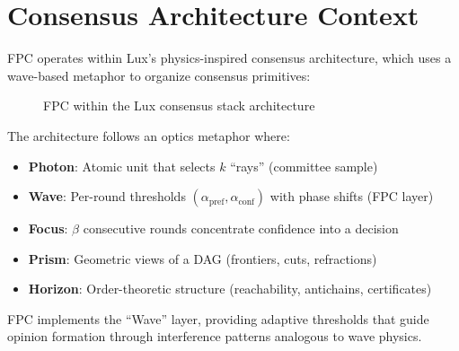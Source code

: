 \section{Consensus Architecture Context}

\label{sec:architecture}

FPC operates within Lux's physics-inspired consensus architecture, which uses a wave-based metaphor to organize consensus primitives:

\begin{figure}[h]
\centering
{}
\caption{FPC within the Lux consensus stack architecture}
\label{fig:architecture}
\end{figure}

The architecture follows an optics metaphor where:
\begin{itemize}
\item \textbf{Photon}: Atomic unit that selects $k$ ``rays'' (committee sample)
\item \textbf{Wave}: Per-round thresholds $(\alpha_{\text{pref}}, \alpha_{\text{conf}})$ with phase shifts (FPC layer)
\item \textbf{Focus}: $\beta$ consecutive rounds concentrate confidence into a decision
\item \textbf{Prism}: Geometric views of a DAG (frontiers, cuts, refractions)
\item \textbf{Horizon}: Order-theoretic structure (reachability, antichains, certificates)
\end{itemize}

FPC implements the ``Wave'' layer, providing adaptive thresholds that guide opinion formation through interference patterns analogous to wave physics.

